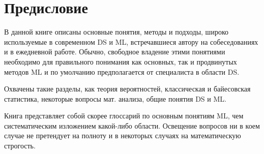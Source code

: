 \chapter*{Предисловие}

В данной книге описаны основные понятия, методы и подходы, широко используемые в современном DS и ML, встречавшиеся автору на собеседованиях и в ежедневной работе. Обычно, свободное владение этими понятиями необходимо для правильного понимания как основных, так и продвинутых методов ML и по умолчанию предполагается от специалиста в области DS.

Охвачены такие разделы, как теория вероятностей, классическая и байесовская статистика, некоторые вопросы мат. анализа, общие понятия DS и ML.

Книга представляет собой скорее глоссарий по основным понятиям ML, чем систематическим изложением какой-либо области. Освещение вопросов ни в коем случае не претендует на полноту и в некоторых случаях на математическую строгость.

